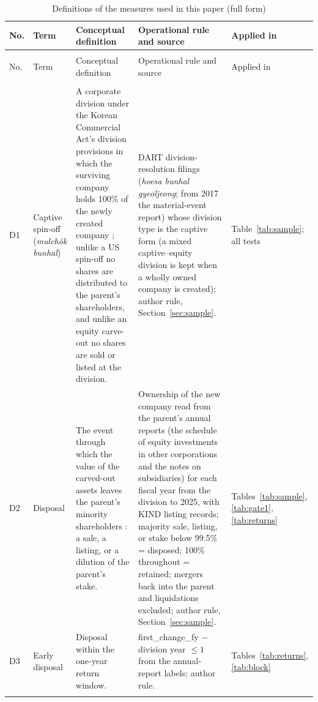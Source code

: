 \begin{longtable}{>{\raggedright\arraybackslash}p{0.7cm}>{\raggedright\arraybackslash}p{2.4cm}>{\raggedright\arraybackslash}p{3.5cm}>{\raggedright\arraybackslash}p{4.8cm}>{\raggedright\arraybackslash}p{2.1cm}}
\caption{Definitions of the measures used in this paper (full form)}\label{tab:s_defs_full}\\
\toprule No. & Term & Conceptual definition & Operational rule and source & Applied in \\ \midrule \endfirsthead
\multicolumn{5}{l}{\small Table~\thetable\ (continued)}\\ \toprule No. & Term & Conceptual definition & Operational rule and source & Applied in \\ \midrule \endhead
\midrule\multicolumn{5}{r}{\small continued on next page}\\ \endfoot
\bottomrule \endlastfoot
D1 & Captive spin-off (\emph{mulchŏk bunhal}) & A corporate division under the Korean Commercial Act's division provisions in which the surviving company holds 100\% of the newly created company \protect\cite{kang2025}; unlike a US spin-off no shares are distributed to the parent's shareholders, and unlike an equity carve-out no shares are sold or listed at the division. & DART division-resolution filings (\emph{hoesa bunhal gyeoljeong}; from 2017 the material-event report) whose division type is the captive form (a mixed captive--equity division is kept when a wholly owned company is created); author rule, Section~\ref{sec:sample}. & Table~\ref{tab:sample}; all tests \\ \addlinespace[2pt]
D2 & Disposal & The event through which the value of the carved-out assets leaves the parent's minority shareholders \protect\cite{kang2025}: a sale, a listing, or a dilution of the parent's stake. & Ownership of the new company read from the parent's annual reports (the schedule of equity investments in other corporations and the notes on subsidiaries) for each fiscal year from the division to 2025, with KIND listing records; majority sale, listing, or stake below 99.5\% = disposed; 100\% throughout = retained; mergers back into the parent and liquidations excluded; author rule, Section~\ref{sec:sample}. & Tables~\ref{tab:sample}, \ref{tab:gate1}, \ref{tab:returns} \\ \addlinespace[2pt]
D3 & Early disposal & Disposal within the one-year return window. & first\_change\_fy $-$ division year $\le 1$ from the annual-report labels; author rule. & Tables~\ref{tab:returns}, \ref{tab:block} \\ \addlinespace[2pt]

\end{longtable}
